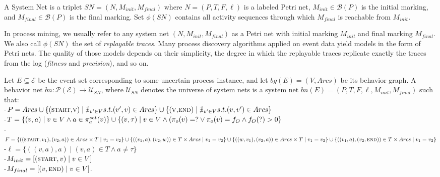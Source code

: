 \begin{definition}
A System Net is a triplet $SN=(N,M_{init},M_{final})$ where $N=(P,T,F,\ell)$ is a labeled Petri net, $M_{init} \in \mathcal{B}(P)$ is the initial marking, and $M_{final} \in \mathcal{B}(P)$ is the final marking.
Set $\phi(SN)$ contains all activity sequences through which $M_{final}$  is reachable from $M_{init}$.
\end{definition}

In process mining, we usually refer to any system net $(N,M_{init},M_{final})$ as a Petri net with initial marking $M_{init}$ and final marking $M_{final}$.
We also call $\phi(SN)$ the set of \textit{replayable traces}.
Many process discovery algorithms applied on event data yield models in the form of Petri nets.
The quality of those models depends on their simplicity, the degree in which the replayable traces replicate exactly the traces from the log (\textit{fitness} and \textit{precision}), and so on.
\pagebreak

\begin{definition} \label{def: bn}
Let $E \subseteq \mathcal{E}$ be the event set corresponding to some uncertain process instance, and let $bg(E)=(V,Arcs)$ be its behavior graph.
A behavior net $bn: \mathcal{P}(\mathcal{E}) \to \mathcal{U}_{SN}$, where $\mathcal{U}_{SN}$ denotes the universe of system nets is a system net $bn(E)=(P,T,F,\ell,M_{init},M_{final})$ such that:\\
-$P= Arcs \cup  \\
\{(\textsc{start,v}) \mid \nexists_{v'\in V} s.t. (v',v) \in Arcs\} \cup  \\
\{(\textsc{v,\textsc{end}}) \mid \nexists_{v'\in V} s.t. (v,v') \in Arcs\}$\\
-$T=\{(v,a) \mid v \in V \wedge a \in \pi_a^{set}(v)\} \cup \\
\{(v,\tau) \mid v \in V \wedge (\pi_o(v) = ? \vee \pi_o(v)=f_O \wedge f_O(?)>0 \}$ \\
-$F= \{((\textsc{start},v_1),(v_2,a)) \in Arcs \times T \mid v_1 = v_2\} \cup \\
\{((v_1,a),(v_2,w)) \in T \times Arcs \mid v_1=v_2\} \cup \\
\{((w,v_1),(v_2,a)) \in Arcs \times T \mid v_1=v_2\} \cup \\
\{((v_1,a),(v_2,\textsc{end})) \in T \times Arcs \mid v_1 = v_2\} $\\
-$\ell=\{((v,a),a) \mid (v,a) \in T \wedge a \neq \tau\}$ \\
-$M_{init} = [(\textsc{start},v) \mid v \in V]$ \\
-$M_{final} = [(v,\textsc{end}) \mid v \in V]$.
\end{definition}


